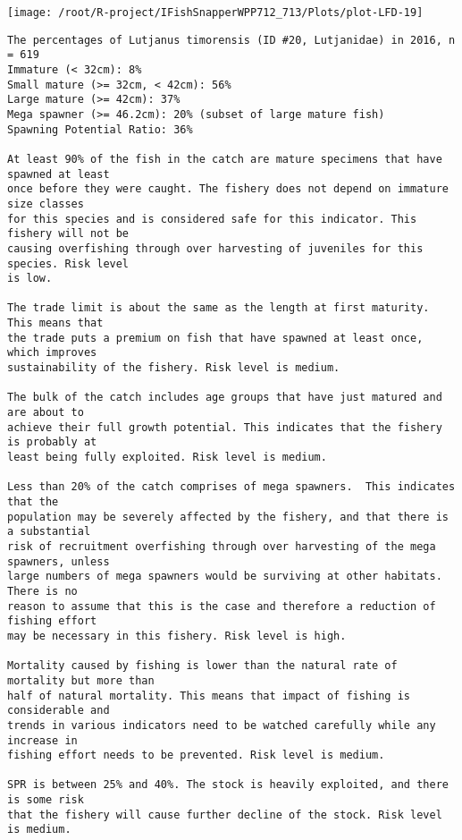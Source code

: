 \documentclass{report}\usepackage[]{graphicx}\usepackage[]{color}
\makeatletter
\def\maxwidth{ %
  \ifdim\Gin@nat@width>\linewidth
    \linewidth
  \else
    \Gin@nat@width
  \fi
}
\newenvironment{kframe}{%
 \def\at@end@of@kframe{}%
 \ifinner\ifhmode%
  \def\at@end@of@kframe{\end{minipage}}%
  \begin{minipage}{\columnwidth}%
 \fi\fi%
 \def\FrameCommand##1{\hskip\@totalleftmargin \hskip-\fboxsep
 \colorbox{shadecolor}{##1}\hskip-\fboxsep
     \hskip-\linewidth \hskip-\@totalleftmargin \hskip\columnwidth}%
 \MakeFramed {\advance\hsize-\width
   \@totalleftmargin\z@ \linewidth\hsize
   \@setminipage}}%
 {\par\unskip\endMakeFramed%
 \at@end@of@kframe}
\newenvironment{knitrout}{}{} %
\makeatother
\begin{document}
\begin{knitrout}
\texttt{[image: /root/R-project/IFishSnapperWPP712\_713/Plots/plot-LFD-19]} 
\begin{kframe}\begin{verbatim}
The percentages of Lutjanus timorensis (ID #20, Lutjanidae) in 2016, n = 619
Immature (< 32cm): 8%
Small mature (>= 32cm, < 42cm): 56%
Large mature (>= 42cm): 37%
Mega spawner (>= 46.2cm): 20% (subset of large mature fish)
Spawning Potential Ratio: 36%
 
At least 90% of the fish in the catch are mature specimens that have spawned at least
once before they were caught. The fishery does not depend on immature size classes
for this species and is considered safe for this indicator. This fishery will not be
causing overfishing through over harvesting of juveniles for this species. Risk level
is low.

The trade limit is about the same as the length at first maturity.  This means that
the trade puts a premium on fish that have spawned at least once, which improves
sustainability of the fishery. Risk level is medium.

The bulk of the catch includes age groups that have just matured and are about to
achieve their full growth potential. This indicates that the fishery is probably at
least being fully exploited. Risk level is medium.

Less than 20% of the catch comprises of mega spawners.  This indicates that the
population may be severely affected by the fishery, and that there is a substantial
risk of recruitment overfishing through over harvesting of the mega spawners, unless
large numbers of mega spawners would be surviving at other habitats. There is no
reason to assume that this is the case and therefore a reduction of fishing effort
may be necessary in this fishery. Risk level is high.
 
Mortality caused by fishing is lower than the natural rate of mortality but more than
half of natural mortality. This means that impact of fishing is considerable and
trends in various indicators need to be watched carefully while any increase in
fishing effort needs to be prevented. Risk level is medium.
 
SPR is between 25% and 40%. The stock is heavily exploited, and there is some risk
that the fishery will cause further decline of the stock. Risk level is medium.
 

\end{verbatim}
\end{kframe}
\end{knitrout}
\end{document}
